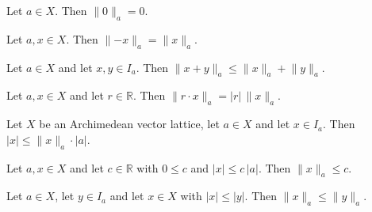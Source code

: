 \begin{lemma}
\label{lem:orderIdeal-gaugeNorm-zero}
\leanok
{}
Let $a \in X$. Then $\lVert 0 \rVert_a = 0$.
\end{lemma}

\begin{lemma}
\label{lem:orderIdeal-gaugeNorm-neg}
\leanok
{}
Let $a, x \in X$. Then $\lVert -x \rVert_a = \lVert x \rVert_a$.
\end{lemma}

\begin{lemma}
\label{lem:orderIdeal-gaugeNorm-add-le}
\leanok
{}
Let $a \in X$ and let $x, y \in I_a$. Then
$\lVert x + y \rVert_a \le \lVert x \rVert_a + \lVert y \rVert_a$.
\end{lemma}

\begin{lemma}
\label{lem:orderIdeal-gaugeNorm-smul}
\leanok
{}
Let $a, x \in X$ and let $r \in \mathbb{R}$. Then
$\lVert r \cdot x \rVert_a = \lvert r \rvert \, \lVert x \rVert_a$.
\end{lemma}

\begin{theorem}
\label{thm:orderIdeal-abs-le-gaugeNorm-smul-abs}
\leanok
{}
Let $X$ be an Archimedean vector lattice, let $a \in X$ and let
$x \in I_a$. Then
$\lvert x \rvert \le \lVert x \rVert_a \cdot \lvert a \rvert$.
\end{theorem}

\begin{lemma}
\label{lem:orderIdeal-gaugeNorm-le-of-abs-le}
\leanok
{}
Let $a, x \in X$ and let $c \in \mathbb{R}$ with $0 \le c$ and
$\lvert x \rvert \le c\,\lvert a \rvert$. Then
$\lVert x \rVert_a \le c$.
\end{lemma}

\begin{lemma}
\label{lem:orderIdeal-gaugeNorm-mono-abs}
\leanok
{}
Let $a \in X$, let $y \in I_a$ and let $x \in X$ with
$\lvert x \rvert \le \lvert y \rvert$. Then
$\lVert x \rVert_a \le \lVert y \rVert_a$.
\end{lemma}

